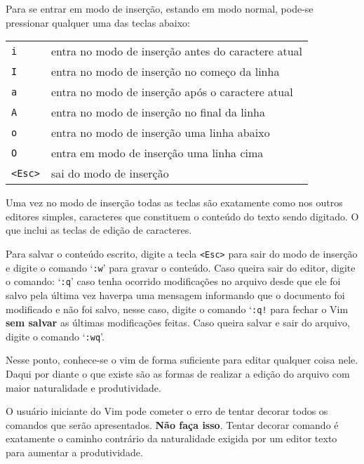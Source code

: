 Para se entrar em modo de inserção, estando em modo normal, pode-se pressionar 
qualquer uma das teclas abaixo:
\begin{table}[htb]\begin{center} \begin{tabular}{ll} \hline
     \verb|i| & entra no modo de inserção antes do caractere atual \\
     \verb|I| & entra no modo de inserção no começo da linha \\
     \verb|a| & entra no modo de inserção após o caractere atual \\
     \verb|A| & entra no modo de inserção no final da linha \\
     \verb|o| & entra no modo de inserção uma linha abaixo \\
     \verb|O| & entra em modo de inserção uma linha cima \\
     \verb|<Esc>| & sai do modo de inserção \\
\hline \end{tabular}\end{center}\end{table}

Uma vez no modo de inserção todas as teclas são exatamente 
como nos outros editores simples, caracteres que constituem o conteúdo do texto 
sendo digitado. 
O que inclui as teclas de edição de caracteres.

Para salvar o conteúdo escrito, digite a tecla
\verb|<Esc>| para sair do modo de inserção e digite o comando `\texttt{:w}'
para gravar o conteúdo.  Caso queira sair do editor,
digite o comando: `\texttt{:q}' caso tenha ocorrido modificações no arquivo
desde que ele foi salvo pela última vez haverpa uma mensagem informando que o
documento foi modificado e não foi salvo, nesse caso, digite o comando `\texttt{:q!}
para fechar o Vim {\bf sem salvar} as últimas modificações feitas.  
Caso queira salvar e sair do arquivo, digite o comando `\texttt{:wq}'.

Nesse ponto, conhece-se o vim de forma suficiente para editar
qualquer coisa nele. Daqui por diante o que existe são as formas de
realizar a edição do arquivo com maior naturalidade e produtividade.

O usuário iniciante do Vim pode cometer o erro de tentar decorar 
todos os comandos que serão apresentados. {\bf Não faça isso}. Tentar decorar
comando é exatamente o caminho contrário da naturalidade exigida por 
um editor texto para aumentar a produtividade.

